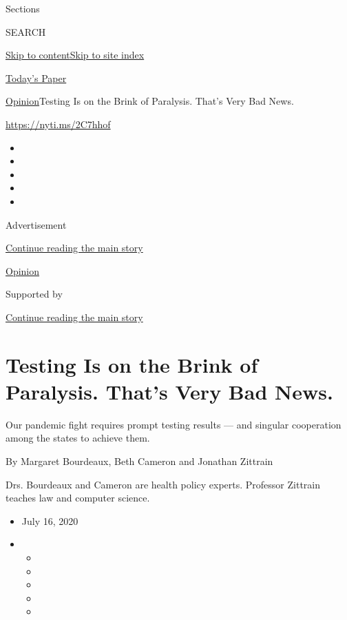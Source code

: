 Sections

SEARCH

\protect\hyperlink{site-content}{Skip to
content}\protect\hyperlink{site-index}{Skip to site index}

\href{https://myaccount.nytimes3xbfgragh.onion/auth/login?response_type=cookie\&client_id=vi}{}

\href{https://www.nytimes3xbfgragh.onion/section/todayspaper}{Today's
Paper}

\href{/section/opinion}{Opinion}\textbar{}Testing Is on the Brink of
Paralysis. That's Very Bad News.

\url{https://nyti.ms/2C7hhof}

\begin{itemize}
\item
\item
\item
\item
\item
\end{itemize}

Advertisement

\protect\hyperlink{after-top}{Continue reading the main story}

\href{/section/opinion}{Opinion}

Supported by

\protect\hyperlink{after-sponsor}{Continue reading the main story}

\hypertarget{testing-is-on-the-brink-of-paralysis-thats-very-bad-news}{%
\section{Testing Is on the Brink of Paralysis. That's Very Bad
News.}\label{testing-is-on-the-brink-of-paralysis-thats-very-bad-news}}

Our pandemic fight requires prompt testing results --- and singular
cooperation among the states to achieve them.

By Margaret Bourdeaux, Beth Cameron and Jonathan Zittrain

Drs. Bourdeaux and Cameron are health policy experts. Professor Zittrain
teaches law and computer science.

\begin{itemize}
\item
  July 16, 2020
\item
  \begin{itemize}
  \item
  \item
  \item
  \item
  \item
  \end{itemize}
\end{itemize}

